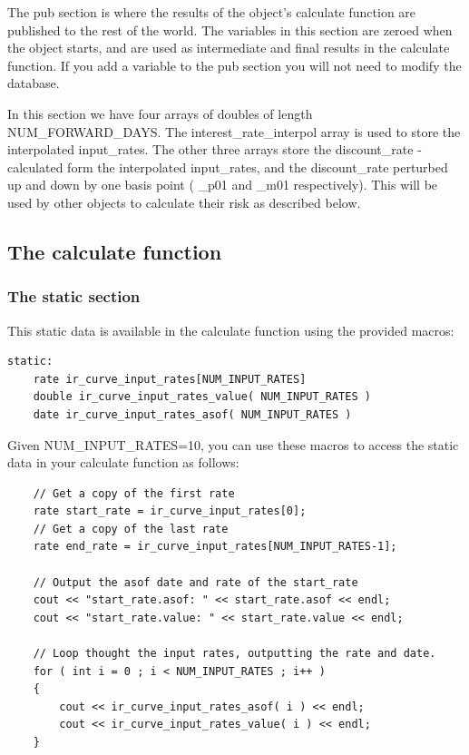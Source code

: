 \documentclass{report}
\begin{document}
The pub section is where the results of the object's calculate function are published to the rest of the world. The variables in this section are zeroed when the object starts, and are used as intermediate and final results in the calculate function. If you add a variable to the pub section you will not need to modify the database.

In this section we have four arrays of doubles of length NUM_FORWARD_DAYS. The interest_rate_interpol array is used to store the interpolated input_rates. The other three arrays store the discount_rate - calculated form the interpolated input_rates, and the discount_rate perturbed up and down by one basis point ( _p01 and _m01 respectively). This will be used by other objects to calculate their risk as described below.

\subsection{The calculate function}

\subsubsection{The static section}

This static data is available in the calculate function using the provided macros:

\begin{verbatim}
static:
    rate ir_curve_input_rates[NUM_INPUT_RATES]
    double ir_curve_input_rates_value( NUM_INPUT_RATES )
    date ir_curve_input_rates_asof( NUM_INPUT_RATES )
\end{verbatim}

Given NUM_INPUT_RATES=10, you can use these macros to access the static data in your calculate function as follows:

\begin{verbatim}
    // Get a copy of the first rate
    rate start_rate = ir_curve_input_rates[0];
    // Get a copy of the last rate
    rate end_rate = ir_curve_input_rates[NUM_INPUT_RATES-1];

    // Output the asof date and rate of the start_rate
    cout << "start_rate.asof: " << start_rate.asof << endl;
    cout << "start_rate.value: " << start_rate.value << endl;

    // Loop thought the input rates, outputting the rate and date.
    for ( int i = 0 ; i < NUM_INPUT_RATES ; i++ )
    {
        cout << ir_curve_input_rates_asof( i ) << endl;
        cout << ir_curve_input_rates_value( i ) << endl;
    }
\end{verbatim}
\end{document}
